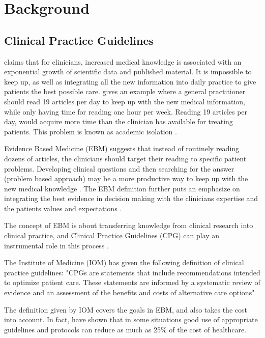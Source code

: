 \chapter{Background}
\section{Clinical Practice Guidelines}
\textcite{Fervers2010} claims that for clinicians, increased medical knowledge is associated with an exponential growth of scientific data and published material. It is impossible to keep up, as well as integrating all the new information into daily practice to give patients the best possible care.  \textcite{Masic2008} gives an example where a general practitioner should read 19 articles per day to keep up with the new medical information, while only having time for reading one hour per week. Reading 19 articles per day, would acquire more time than the clinician has available for treating patients. This problem is known as academic isolation \parencite{Masic2008}.

Evidence Based Medicine (EBM) suggests that instead of routinely reading dozens of articles, the clinicians should target their reading to specific patient problems. Developing clinical questions and then searching for the answer (problem based approach) may be a more productive way to keep up with the new medical knowledge \parencite{Masic2008}. The EBM definition further puts an emphasize on integrating the best evidence in decision making with the clinicians expertise and the patients values and expectations \parencite{Masic2008}. 

The concept of EBM is about transferring knowledge from clinical research into clinical practice, and Clinical Practice Guidelines (CPG) can play an instrumental role in this process \parencite{Fervers2010}.

The Institute of Medicine (IOM) has given the following definition of clinical practice guidelines: "CPGs are statements that include recommendations intended to optimize patient care. These statements are informed by a systematic review of evidence and an assessment of the benefits and costs of alternative care options" \parencite{Guidelines2011}

The definition given by IOM covers the goals in EBM, and also takes the cost into account. In fact, \textcite{Clayton1995} have shown that in some situations good use of appropriate guidelines and protocols can reduce as much as 25\% of the cost of healthcare.

